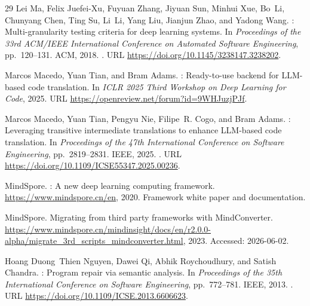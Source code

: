 \documentclass{article}
\begin{document}
\begin{thebibliography}{29}
Lei Ma, Felix Juefei-Xu, Fuyuan Zhang, Jiyuan Sun, Minhui Xue, Bo~Li, Chunyang
  Chen, Ting Su, Li~Li, Yang Liu, Jianjun Zhao, and Yadong Wang.
: Multi-granularity testing criteria for deep learning
  systems.
\newblock In \emph{Proceedings of the 33rd ACM/IEEE International Conference on
  Automated Software Engineering}, pp.\  120--131. ACM, 2018.
\newblock {}.
\newblock URL \url{https://doi.org/10.1145/3238147.3238202}.

Marcos Macedo, Yuan Tian, and Bram Adams.
: Ready-to-use backend for {LLM}-based code
  translation.
\newblock In \emph{ICLR 2025 Third Workshop on Deep Learning for Code},
  2025{}.
\newblock URL \url{https://openreview.net/forum?id=9WHJuzjPJf}.

Marcos Macedo, Yuan Tian, Pengyu Nie, Filipe~R. Cogo, and Bram Adams.
: Leveraging transitive intermediate translations to
  enhance {LLM}-based code translation.
\newblock In \emph{Proceedings of the 47th International Conference on Software
  Engineering}, pp.\  2819--2831. IEEE, 2025{}.
\newblock {}.
\newblock URL \url{https://doi.org/10.1109/ICSE55347.2025.00236}.

{MindSpore}.
: A new deep learning computing framework.
\newblock \url{https://www.mindspore.cn/en}, 2020.
\newblock Framework white paper and documentation.

{MindSpore}.
\newblock Migrating from third party frameworks with {MindConverter}.
\newblock
  \url{https://www.mindspore.cn/mindinsight/docs/en/r2.0.0-alpha/migrate_3rd_scripts_mindconverter.html},
  2023.
\newblock Accessed: 2026-06-02.

Hoang Duong~Thien Nguyen, Dawei Qi, Abhik Roychoudhury, and Satish Chandra.
: Program repair via semantic analysis.
\newblock In \emph{Proceedings of the 35th International Conference on Software
  Engineering}, pp.\  772--781. IEEE, 2013.
\newblock {}.
\newblock URL \url{https://doi.org/10.1109/ICSE.2013.6606623}.


\end{thebibliography}
\end{document}
